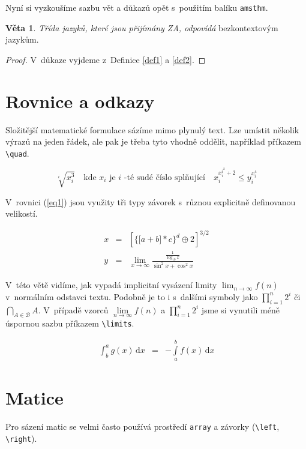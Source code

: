 \documentclass[twocolumn,11pt]{article}
\theoremstyle{definition}
\newtheorem{sentence}{Věta}
\begin{document}
Nyní si vyzkoušíme sazbu vět a důkazů opět s~použitím balíku \texttt{amsthm}.

\begin{sentence}
\emph{Třída jazyků, které jsou přijímány ZA, odpovídá} bezkontextovým jazykům.
\end{sentence}
\begin{proof}
V~důkaze vyjdeme z~Definice \ref{def1} a \ref{def2}.
\end{proof}

\section{Rovnice a odkazy}
Složitější matematické formulace sázíme mimo plynulý text. Lze umístit několik výrazů na jeden řádek, ale pak je třeba tyto vhodně oddělit, například příkazem \verb|\quad|.

$$
\sqrt[i]{x_{i}^{3}} \quad 
\text {kde } 
x_{i} 
\text { je } 
i 
\text { -té sudé číslo splňující} 
\quad x_{i}^{x_{i}^{i^{2}}+2} 
\leq y_{i}^{x_{i}^{4}}
$$

V~rovnici (\ref{eq1}) jsou využity tři typy závorek s~různou explicitně definovanou velikostí.

\begin{eqnarray}
\label{eq1}
x &=&\left[\Big\{\big[a+b\big] * c\Big\}^{d} \oplus 2\right]^{3 / 2} \\
y &=&\lim _{x \rightarrow \infty} \frac{\frac{1}{\log _{10} x}}{\sin ^{2} x+\cos ^{2} x} \nonumber
\end{eqnarray}

V~této větě vidíme, jak vypadá implicitní vysázení limity 
$\lim _{n \rightarrow \infty}f(n)$ 
v~normálním odstavci textu. Podobně je to i s~dalšími symboly jako 
$\prod_{i=1}^n 2^i$ 
či 
$\bigcap_{A\in \mathcal{B}} A$. 
V~případě vzorců 
$\lim\limits_{n \rightarrow \infty}f(n)$ 
a 
$\prod\limits_{i=1}^n 2^i$ 
jsme si vynutili méně úspornou sazbu příkazem \verb|\limits|.

\begin{eqnarray}
    \int_b^a g(x)\,\mathrm{d}x & = & -\int\limits_a^b f(x)\,\mathrm{d}x
\end{eqnarray}




\section{Matice}
Pro sázení matic se velmi často používá prostředí \texttt{array} a závorky (\verb|\left|, \verb|\right|).
\end{document}
